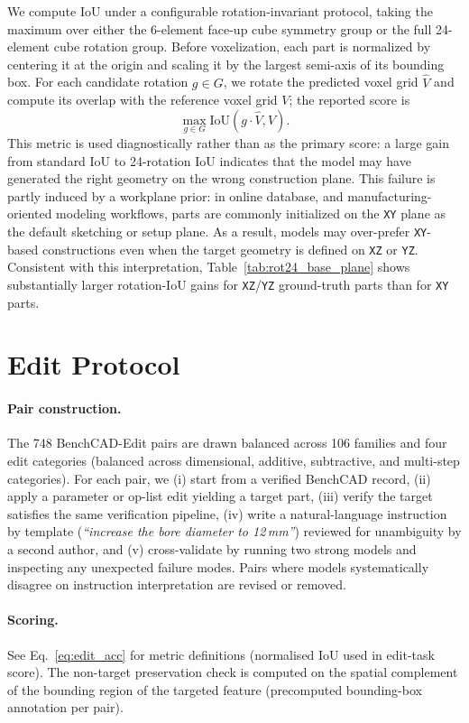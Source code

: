 We compute IoU under a configurable rotation-invariant protocol, taking the maximum over either the 6-element face-up cube symmetry group or the full 24-element cube rotation group. Before voxelization, each part is normalized by centering it at the origin and scaling it by the largest semi-axis of its bounding box. For each candidate rotation $g \in G$, we rotate the predicted voxel grid $\hat{V}$ and compute its overlap with the reference voxel grid $V$; the reported score is
\[
\max_{g \in G} \mathrm{IoU}(g \cdot \hat{V}, V).
\]
This metric is used diagnostically rather than as the primary score: a large gain from standard IoU to 24-rotation IoU indicates that the model may have generated the right geometry on the wrong construction plane. This failure is partly induced by a workplane prior: in online database, and manufacturing-oriented modeling workflows, parts are commonly initialized on the \texttt{XY} plane as the default sketching or setup plane. As a result, models may over-prefer \texttt{XY}-based constructions even when the target geometry is defined on \texttt{XZ} or \texttt{YZ}. Consistent with this interpretation, Table~\ref{tab:rot24_base_plane} shows substantially larger rotation-IoU gains for \texttt{XZ}/\texttt{YZ} ground-truth parts than for \texttt{XY} parts.


\section{Edit Protocol}
\label{app:edit_protocol}

\paragraph{Pair construction.} The 748 BenchCAD-Edit pairs are drawn balanced across 106 families and four edit categories (balanced across dimensional, additive, subtractive, and multi-step categories).
For each pair, we (i) start from a verified BenchCAD record, (ii) apply a parameter or op-list edit yielding a target part, (iii) verify the target satisfies the same verification pipeline, (iv) write a natural-language instruction by template (\emph{``increase the bore diameter to 12\,mm''}) reviewed for unambiguity by a second author, and (v) cross-validate by running two strong models and inspecting any unexpected failure modes.
Pairs where models systematically disagree on instruction interpretation are revised or removed.

\paragraph{Scoring.} See Eq.~\ref{eq:edit_acc} for metric definitions (normalised IoU used in edit-task score). The non-target preservation check is computed on the spatial complement of the bounding region of the targeted feature (precomputed bounding-box annotation per pair).


